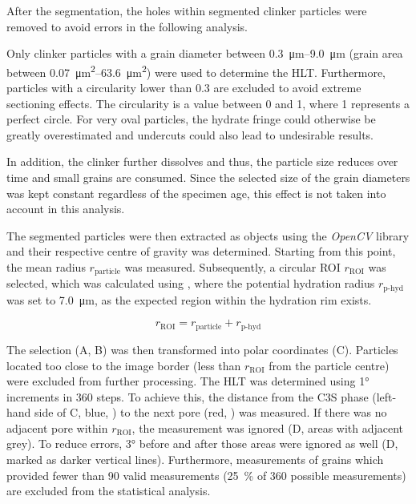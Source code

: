 After the segmentation, the holes within segmented clinker particles were removed to avoid errors in the following analysis.

Only clinker particles with a grain diameter between \qtyrange{0.3}{9.0}{\micro\meter} (grain area between \qtyrange{0.07}{63.6}{\square\micro\meter}) were used to determine the \ac{HLT}.
Furthermore, particles with a circularity lower than \num{0.3} are excluded to avoid extreme sectioning effects.
The circularity is a value between \num{0} and \num{1}, where \num{1} represents a perfect circle.
For very oval particles, the hydrate fringe could otherwise be greatly overestimated and undercuts could also lead to undesirable results.

In addition, the clinker further dissolves and thus, the particle size reduces over time and small grains are consumed.
Since the selected size of the grain diameters was kept constant regardless of the specimen age, this effect is not taken into account in this analysis. %

The segmented particles were then extracted as objects using the \textit{OpenCV} \cite{bradski.2000} library and their respective centre of gravity was determined.
Starting from this point, the mean radius $r_\text{particle}$ was measured.
Subsequently, a circular \ac{ROI} $r_\text{ROI}$ was selected, which was calculated using , where the potential hydration radius $r_\text{p-hyd}$ was set to \qty{7.0}{\micro\meter}, as the expected region within the hydration rim exists.

\begin{equation}
	\label{eq:r-roi}
	r_\text{ROI} = r_\text{particle} + r_\text{p-hyd}
\end{equation}

The selection (A, B) was then transformed into polar coordinates (C).
Particles located too close to the image border (less than $r_\text{ROI}$ from the particle centre) were excluded from further processing.
The \ac{HLT} was determined using \ang{1} increments in \num{360} steps.
To achieve this, the distance from the \ac{C3S} phase (left-hand side of C, blue, ) to the next pore (red, ) was measured.
If there was no adjacent pore within $r_\text{ROI}$, the measurement was ignored (D, areas with adjacent grey).
To reduce errors, \ang{3} before and after those areas were ignored as well (D, marked as darker vertical lines).
Furthermore, measurements of grains which provided fewer than \num{90} valid measurements (\qty{25}{\percent} of \num{360} possible measurements) are excluded from the statistical analysis.

